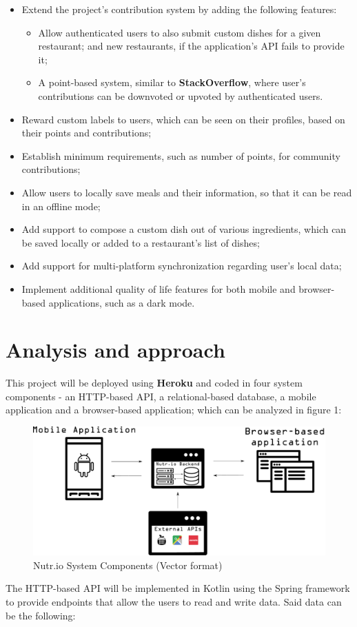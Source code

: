 \documentclass{article}
\begin{document}
\begin{itemize}
    \item Extend the project's contribution system by adding the following features:
    \begin{itemize}
        \item Allow authenticated users to also submit custom dishes for a given restaurant; and new restaurants, if the application's API fails to provide it;
        \item A point-based system, similar to \textbf{StackOverflow}\cite{stackoverflow}, where user's contributions can be downvoted or upvoted by authenticated users.
    \end{itemize}
    \item Reward custom labels to users, which can be seen on their profiles, based on their points and contributions;
    \item Establish minimum requirements, such as number of points, for community contributions;
    \item Allow users to locally save meals and their information, so that it can be read in an offline mode;
    \item Add support to compose a custom dish out of various ingredients, which can be saved locally or added to a restaurant's list of dishes;
    \item Add support for multi-platform synchronization regarding user's local data;
    \item Implement additional quality of life features for both mobile and browser-based applications, such as a dark mode.
\end{itemize}

\section{Analysis and approach}

This project will be deployed using \textbf{Heroku}\cite{heroku} and coded in four system components - an HTTP-based API, a relational-based database, a mobile application and a browser-based application; which can be analyzed in figure 1:\\

\begin{figure}[H]
    \centering
    \includegraphics[scale=0.3]{pictures/Nutr.io System Components.pdf}
    \caption{Nutr.io System Components (Vector format)}
    \label{fig:Nutr.io System Components}
\end{figure}
The HTTP-based API will be implemented in Kotlin using the Spring framework to provide endpoints that allow the users to read and write data. Said data can be the following:
\end{document}
